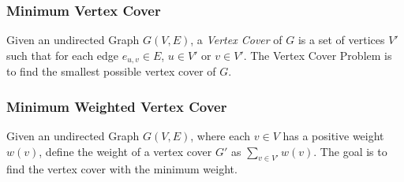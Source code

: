 \subsubsection{Minimum Vertex Cover}
\label{sub:mvc}
Given an undirected Graph $G(V,E)$, a {\em Vertex Cover} of $G$ is a set of vertices $V'$ such that for each edge $e_{u,v} \in E$, $u \in V'$ or $v \in V'$. The Vertex Cover Problem is to find the smallest possible vertex cover of $G$.

\subsubsection{Minimum Weighted Vertex Cover}
\label{sub:mwvc}
Given an undirected Graph $G(V,E)$, where each $v \in V$ has a positive weight $w(v)$, define the weight of a vertex cover $G'$ as $\sum_{v \in V'} w(v)$. The goal is to find the vertex cover with the minimum weight.



